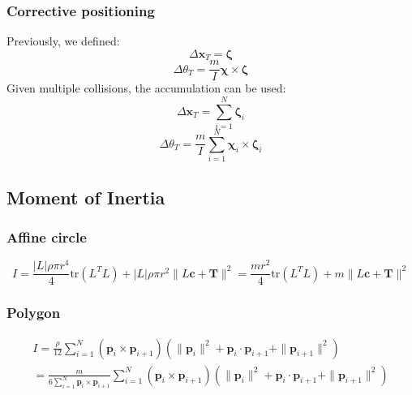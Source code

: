 \documentclass[10pt]{report}
\begin{document}
\subsubsection{Corrective positioning}
Previously, we defined:
\begin{equation}\Delta\boldsymbol{x}_T=\boldsymbol{\zeta}\end{equation}
\begin{equation}\Delta\theta_T=\frac{m}{I}\boldsymbol{\chi}\times\boldsymbol{\zeta}\end{equation}
Given multiple collisions, the accumulation can be used:
\begin{equation}\Delta\boldsymbol{x}_T=\sum_{i=1}^N\boldsymbol{\zeta}_i\end{equation}
\begin{equation}\Delta\theta_T=\frac{m}{I}\sum_{i=1}^N\boldsymbol{\chi}_i\times\boldsymbol{\zeta}_i\end{equation}

\subsection{Moment of Inertia}

\subsubsection{Affine circle}
\begin{equation}I=\frac{|L|\rho\pi r^4}{4}\mbox{tr}(L^TL)+|L|\rho\pi r^2\|L\boldsymbol{c}+\boldsymbol{T}\|^2=\frac{mr^2}{4}\mbox{tr}(L^TL)+m\|L\boldsymbol{c}+\boldsymbol{T}\|^2\end{equation}

\subsubsection{Polygon}
\begin{multline}I=\frac{\rho}{12}\sum_{i=1}^N(\boldsymbol{p}_i\times\boldsymbol{p}_{i+1})(\|\boldsymbol{p}_i\|^2+\boldsymbol{p}_i\cdot\boldsymbol{p}_{i+1}+\|\boldsymbol{p}_{i+1}\|^2)\\=\frac{m}{6\sum_{i=1}^N\boldsymbol{p}_i\times\boldsymbol{p}_{i+1}}\sum_{i=1}^N(\boldsymbol{p}_i\times\boldsymbol{p}_{i+1})(\|\boldsymbol{p}_i\|^2+\boldsymbol{p}_i\cdot\boldsymbol{p}_{i+1}+\|\boldsymbol{p}_{i+1}\|^2)\end{multline}
\end{document}
